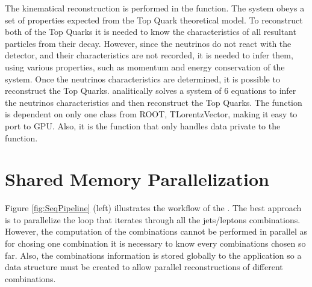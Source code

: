 The kinematical reconstruction is performed in the \dilep function. The \ttbar system obeys a set of properties expected from the Top Quark theoretical model. To reconstruct both of the Top Quarks it is needed to know the characteristics of all resultant particles from their decay. However, since the neutrinos do not react with the detector, and their characteristics are not recorded, it is needed to infer them, using various properties, such as momentum and energy conservation of the system. Once the neutrinos characteristics are determined, it is possible to reconstruct the Top Quarks. \dilep analitically solves a system of 6 equations to infer the neutrinos characteristics and then reconstruct the Top Quarks. The function is dependent on only one class from ROOT, TLorentzVector, making it easy to port to GPU. Also, it is the function that only handles data private to the function.

\section{Shared Memory Parallelization}
\label{Parallelization:SharedMem}

Figure \ref{fig:SeqPipeline} (left) illustrates the workflow of the \ttDilepKinFit. The best approach is to parallelize the loop that iterates through all the jets/leptons combinations. However, the computation of the combinations cannot be performed in parallel as for chosing one combination it is necessary to know every combinations chosen so far. Also, the combinations information is stored globally to the application so a data structure must be created to allow parallel reconstructions of different combinations.

